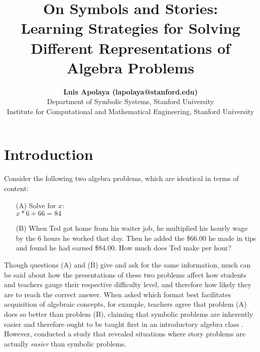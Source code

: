 \documentclass[10pt,letterpaper]{article}
\title{On Symbols and Stories:\\Learning Strategies for Solving Different Representations of Algebra Problems}
\author{{\large \bf Luis Apolaya (lapolaya@stanford.edu)} \\
	Department of Symbolic Systems, Stanford University
	\AND {\large \bf Amy Shoemaker (amyshoe@stanford.edu)} \\
	Institute for Computational and Mathematical Engineering, Stanford University}
\newcommand\TODO[1]{\textcolor{red}{#1}}
\begin{document}
	
	\maketitle
	
	
	
	
	\section{Introduction}
	
	
	Consider the following two algebra problems, which are identical in terms of content:
	
	\begin{enumerate}
		\item[(A)] Solve for $x$:\\ $x * 6 + 66 = 84$
		
		\item[(B)] When Ted got home from his waiter job, he multiplied his hourly wage by the 6 hours he worked that day. Then he added the \$66.00 he made in tips and found he had earned \$84.00. How much does Ted make per hour?
	\end{enumerate}
	
	Though questions (A) and (B) give and ask for the same information, much can be said about how the presentations of these two problems affect how students and teachers gauge their respective difficulty level, and therefore how likely they are to reach the correct answer. When asked which format best facilitates acquisition of algebraic concepts, for example, teachers agree that problem (A) does so better than problem (B), claiming that symbolic problems are inherently easier and therefore ought to be taught first in an introductory algebra class \cite{KoedNath2004,Nathan2012}. However,  conducted a study that revealed situations where story problems are actually \textit{easier} than symbolic problems. 
	
\end{document}
